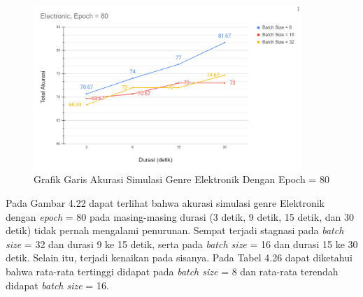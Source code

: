 \begin{enumerate}
		\begin{figure}[H]
			\centering
			
			\includegraphics[width=0.9\textwidth]{gambar/e80_chart_sum accuracy_electronic}
			
			\caption{Grafik Garis Akurasi Simulasi Genre Elektronik Dengan Epoch = 80}
			\label{fig:elecsumcharte80}
		\end{figure}
		
		Pada Gambar 4.22 dapat terlihat bahwa akurasi simulasi genre Elektronik dengan \emph{epoch} = 80 pada masing-masing durasi (3 detik, 9 detik, 15 detik, dan 30 detik) tidak pernah mengalami penurunan. Sempat terjadi stagnasi pada \emph{batch size} = 32 dan durasi 9 ke 15 detik, serta pada \emph{batch size} = 16 dan durasi 15 ke 30 detik. Selain itu, terjadi kenaikan pada sisanya. Pada Tabel 4.26 dapat diketahui bahwa rata-rata tertinggi didapat pada \emph{batch size} = 8 dan rata-rata terendah didapat \emph{batch size} = 16.
		

\end{enumerate}
